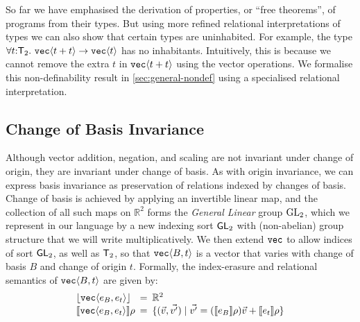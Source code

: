 \begin{example}\label{ex:uninhabited-type}
  So far we have emphasised the derivation of properties, or ``free
  theorems'', of programs from their types. But using more refined
  relational interpretations of types we can also show that certain
  types are uninhabited. For example, the type $\forall t \mathord:
  \mathsf{T}_2.\ \textup{\texttt{vec}}\langle t + t \rangle \to \textup{\texttt{vec}}\langle t \rangle$ has no
  inhabitants. Intuitively, this is because we cannot remove the extra
  $t$ in $\textup{\texttt{vec}}\langle t+t \rangle$ using the vector operations. We formalise
  this non-definability result in \autoref{sec:general-nondef} using a
  specialised relational interpretation.
\end{example}

\subsection{Change of Basis Invariance}
\label{sec:motivation-generalising}

Although vector addition, negation, and scaling are not invariant
under change of origin, they are invariant under change of basis. As
with origin invariance, we can express basis invariance as
preservation of relations indexed by changes of basis. Change of basis
is achieved by applying an invertible linear map, and the collection
of all such maps on $\mathbb{R}^2$ forms the \emph{General Linear}
group $\mathrm{GL}_2$, which we represent in our language by a new indexing
sort $\mathsf{GL}_2$ with (non-abelian) group structure that we will write
multiplicatively. We then extend $\textup{\texttt{vec}}$ to allow indices of
sort $\mathsf{GL}_2$, as well as $\mathsf{T}_2$, so that
$\textup{\texttt{vec}}\langle B,t \rangle$ is a vector that varies with change of basis $B$
and change of origin $t$. Formally, the index-erasure and relational
semantics of $\textup{\texttt{vec}}\langle B,t \rangle$ are given by:
\begin{displaymath}
  \begin{array}{l@{\hspace{0.5em}=\hspace{0.5em}}l}
    \tySem{\tyPrim{vec}{e_B,e_t}} & \mathbb{R}^2
    \\ \rsem{\tyPrim{vec}{e_B,e_t}}{}\rho & \{ (\vec{v},\vec{v'})
    \sepbar \vec{v'} = (\sem{e_B}\rho)\vec{v} + \sem{e_t}\rho \}
  \end{array}
\end{displaymath}

